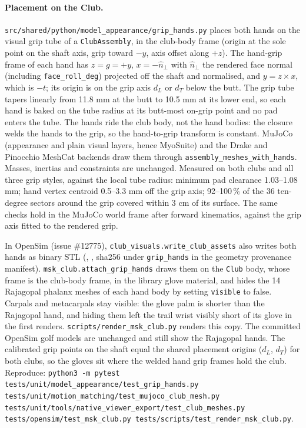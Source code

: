 \documentclass[11pt,a4paper]{article}
\begin{document}
\paragraph{Placement on the Club.}
\texttt{src/shared/python/model\_appearance/grip\_hands.py} places both hands
on the visual grip tube of a \texttt{ClubAssembly}, in the club-body frame
(origin at the sole point on the shaft axis, grip toward $-y$, axis offset
along $+z$). The hand-grip frame of each hand has $z=g=+y$, $x=-\hat n_\perp$
with $\hat n_\perp$ the rendered face normal (including
\texttt{face\_roll\_deg}) projected off the shaft and normalised, and
$y=z\times x$, which is $-t$; its origin is on the grip axis $d_L$ or $d_T$
below the butt. The grip tube tapers linearly from 11.8 mm at the butt to
10.5 mm at its lower end, so each hand is baked on the tube radius at its
butt-most on-grip point and no pad enters the tube. The hands ride the club
body, not the hand bodies: the closure welds the hands to the grip, so the
hand-to-grip transform is constant. MuJoCo (appearance and plain visual
layers, hence MyoSuite) and the Drake and Pinocchio MeshCat backends draw them
through \texttt{assembly\_meshes\_with\_hands}. Masses, inertias and
constraints are unchanged. Measured on both clubs and all three grip styles,
against the local tube radius: minimum pad clearance 1.03--1.08 mm; hand
vertex centroid 0.5--3.3 mm off the grip axis; 92--100\,\% of the 36
ten-degree sectors around the grip covered within 3 cm of its surface. The
same checks hold in the MuJoCo world frame after forward kinematics, against
the grip axis fitted to the rendered grip.

In OpenSim (issue \#12775), \texttt{club\_visuals.write\_club\_assets} also
writes both hands as binary STL (,
, sha256 under \texttt{grip\_hands} in
the geometry provenance manifest). \texttt{msk\_club.attach\_grip\_hands}
draws them on the \texttt{Club} body, whose frame is the club-body frame, in
the library glove material, and hides the 14 Rajagopal phalanx meshes of each
hand body by setting \texttt{visible} to false. Carpals and metacarpals stay
visible: the glove palm is shorter than the Rajagopal hand, and hiding them
left the trail wrist visibly short of its glove in the first renders.
\texttt{scripts/render\_msk\_club.py} renders this copy. The committed OpenSim
golf models are unchanged and still show the Rajagopal hands. The calibrated
grip points on the shaft equal the shared placement origins ($d_L$, $d_T$)
for both clubs, so the gloves sit where the welded hand grip frames hold the
club. Reproduce:
\texttt{python3 -m pytest tests/unit/model\_appearance/test\_grip\_hands.py
tests/unit/motion\_matching/test\_mujoco\_club\_mesh.py
tests/unit/tools/native\_viewer\_export/test\_club\_meshes.py
tests/opensim/test\_msk\_club.py tests/scripts/test\_render\_msk\_club.py}.
\end{document}
